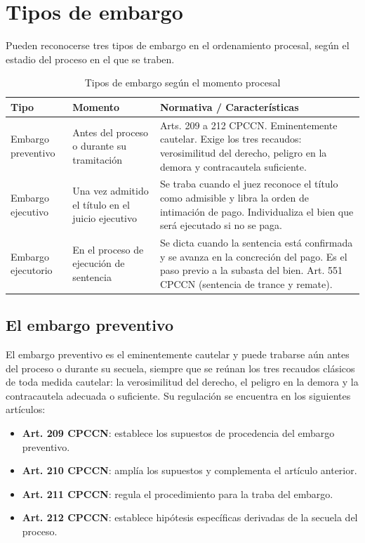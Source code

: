 \documentclass[12pt,oneside]{book}
\begin{document}
\section{Tipos de embargo}

Pueden reconocerse tres tipos de embargo en el ordenamiento procesal, según el estadio del proceso en el que se traben.

\begin{table}[H]
\centering
\caption{Tipos de embargo según el momento procesal}
\begin{tabularx}{\textwidth}{l l X}
\toprule
\textbf{Tipo} & \textbf{Momento} & \textbf{Normativa / Características} \\
\midrule
Embargo preventivo & Antes del proceso o durante su tramitación & Arts. 209 a 212 CPCCN. Eminentemente cautelar. Exige los tres recaudos: verosimilitud del derecho, peligro en la demora y contracautela suficiente. \\
\addlinespace
Embargo ejecutivo & Una vez admitido el título en el juicio ejecutivo & Se traba cuando el juez reconoce el título como admisible y libra la orden de intimación de pago. Individualiza el bien que será ejecutado si no se paga. \\
\addlinespace
Embargo ejecutorio & En el proceso de ejecución de sentencia & Se dicta cuando la sentencia está confirmada y se avanza en la concreción del pago. Es el paso previo a la subasta del bien. Art. 551 CPCCN (sentencia de trance y remate). \\
\bottomrule
\end{tabularx}
\end{table}

\subsection{El embargo preventivo}

El embargo preventivo es el eminentemente cautelar y puede trabarse aún antes del proceso o durante su secuela, siempre que se reúnan los tres recaudos clásicos de toda medida cautelar: la verosimilitud del derecho, el peligro en la demora y la contracautela adecuada o suficiente. Su regulación se encuentra en los siguientes artículos:

\begin{itemize}
    \item \textbf{Art. 209 CPCCN}: establece los supuestos de procedencia del embargo preventivo.
    \item \textbf{Art. 210 CPCCN}: amplía los supuestos y complementa el artículo anterior.
    \item \textbf{Art. 211 CPCCN}: regula el procedimiento para la traba del embargo.
    \item \textbf{Art. 212 CPCCN}: establece hipótesis específicas derivadas de la secuela del proceso.
\end{itemize}
\end{document}
